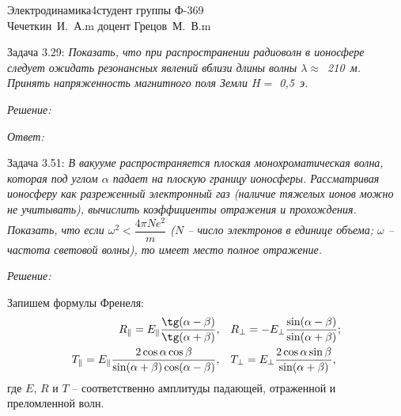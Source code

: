 





\newcommand{\ds}{\displaystyle}
\renewcommand{\i}{\mathtt{i}}


{Электродинамика}{4}{}{студент группы Ф-369\\Чечеткин~И.~А.}{m}
{доцент Грецов~М.~В.}{m}

\newpage
Задача 3.29: \emph{Показать, что при распространении радиоволн в ионосфере
следует ожидать резонансных явлений вблизи длины волны
\( \lambda \approx \)~210~м. Принять напряженность магнитного поля Земли
\( H = \) 0,5~э.}

\vspace*{2em}
\emph{Решение:}

\vspace*{2em}   
\emph{Ответ:}

\newpage
Задача 3.51: \emph{В вакууме распространяется плоская монохроматическая волна,
которая под углом \( \alpha \) падает на плоскую границу ионосферы.
Рассматривая ионосферу как разреженный электронный газ (наличие тяжелых ионов
можно не учитывать), вычислить коэффициенты отражения и прохождения. Показать,
что если \( \omega^2 < \dfrac{4\pi Ne^2}{m} \) (\( N \) -- число электронов в
единице объема; \( \omega \) -- частота световой волны), то имеет место полное
отражение.}

\vspace*{2em}
\emph{Решение:}

Запишем формулы Френеля:
\begin{align*}
    R_\| = E_\|\frac{\tg(\alpha-\beta)}{\tg(\alpha+\beta)}, &&&
    R_\perp = -E_\perp\frac{\sin(\alpha-\beta)}{\sin(\alpha+\beta)}; \\
    T_\| = E_\|\frac{2\cos\alpha\cos\beta}{\sin(\alpha+\beta)
    \cos(\alpha-\beta)}, &&&
    T_\perp = E_\perp\frac{2\cos\alpha\sin\beta}{\sin(\alpha+\beta)},
\end{align*}
где \( E \), \( R \) и \( T \) -- соответственно амплитуды падающей, отраженной
и преломленной волн.


